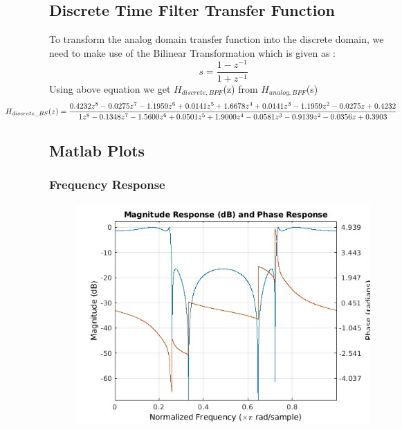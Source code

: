 \documentclass{article}
\begin{document}
\subsection{Discrete Time Filter Transfer Function}
To transform the analog domain transfer function into the discrete domain, we need to make use of the Bilinear Transformation which is given as :
\begin{equation*}
    s = \frac{1 - z^{-1}}{1 + z^{-1}}
\end{equation*}
Using  above  equation  we  get $H_{discrete,BPF}$(z)  from $H_{analog,BPF}$(s)
\begin{equation*}
    \hspace*{-2cm}
H_{discrete\_BS}(z) = \frac{0.4232z^8 - 0.0275z^7 - 1.1959z^6 + 0.0141z^5 + 1.6678z^4 + 0.0141z^3 - 1.1959z^2 - 0.0275z + 0.4232}{1z^8 - 0.1348z^7 - 1.5600z^6 + 0.0501z^5 + 1.9000z^4 - 0.0581z^3 - 0.9139z^2 - 0.0356z + 0.3903}  
\end{equation*}


\subsection{Matlab Plots}
\subsubsection{Frequency Response}
\begin{figure}[H]
\hspace*{-2.5cm}
    \centering
    \includegraphics[width=1.5\linewidth, height=0.65\textheight]{bsf_freq.jpg}
    \label{fig:my_label}
\end{figure}
\end{document}
